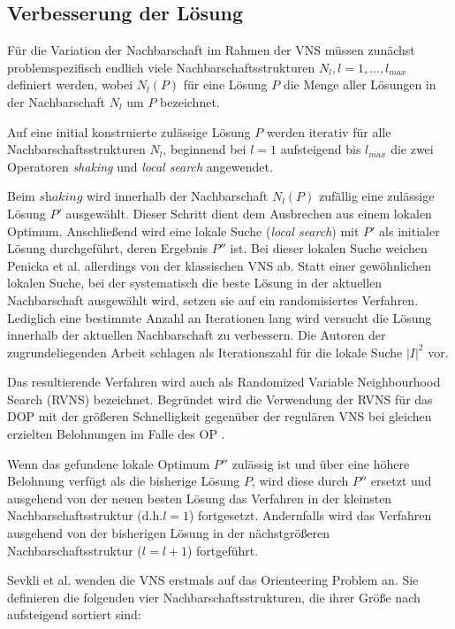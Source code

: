 \documentclass[12pt,a4paper,twoside]{article}
\theoremstyle{definition}
\numberwithin{equation}{section}
\begin{document}
\subsection{Verbesserung der Lösung}\label{subsection:improvement}
Für die Variation der Nachbarschaft im Rahmen der VNS müssen zunächst problemspezifisch endlich viele Nachbarschaftsstrukturen $N_l, l = 1,...,l_{max}$ definiert werden, wobei $N_l(P)$ für eine Lösung $P$ die Menge aller Lösungen in der Nachbarschaft $N_l$ um $P$ bezeichnet.

Auf eine initial konstruierte zulässige Lösung $P$ werden iterativ für alle Nachbarschaftsstrukturen $N_l$, beginnend bei $l = 1$ aufsteigend bis $l_{max}$ die zwei Operatoren \textit{shaking} und \textit{local search} angewendet.

Beim $\textit{shaking}$ wird innerhalb der Nachbarschaft $N_l(P)$ zufällig eine zulässige Lösung $P'$ ausgewählt. Dieser Schritt dient dem Ausbrechen aus einem lokalen Optimum. Anschließend wird eine lokale Suche (\textit{local search}) mit $P'$ als initialer Lösung durchgeführt, deren Ergebnis $P''$ ist.
Bei dieser lokalen Suche weichen Penicka et al. \cite{R.Penicka.2017} allerdings von der klassischen VNS ab. Statt einer gewöhnlichen lokalen Suche, bei der systematisch die beste Lösung in der aktuellen Nachbarschaft ausgewählt wird, setzen sie auf ein randomisiertes Verfahren. Lediglich eine bestimmte Anzahl an Iterationen lang wird versucht die Lösung innerhalb der aktuellen Nachbarschaft zu verbessern. Die Autoren der zugrundeliegenden Arbeit schlagen als Iterationszahl für die lokale Suche $|I|^2$ vor.

Das resultierende Verfahren wird auch als Randomized Variable Neighbourhood Search (RVNS) bezeichnet. Begründet wird die Verwendung der RVNS für das DOP mit der größeren Schnelligkeit gegenüber der regulären VNS bei gleichen erzielten Belohnungen im Falle des OP \cite{Sevkli.2006}.

Wenn das gefundene lokale Optimum $P''$ zulässig ist und über eine höhere Belohnung verfügt als die bisherige Lösung $P$, wird diese durch $P''$ ersetzt und ausgehend von der neuen besten Lösung das Verfahren in der kleinsten Nachbarschaftsstruktur (d.h.$l = 1$) fortgesetzt. Andernfalls wird das Verfahren ausgehend von der bisherigen Lösung in der nächstgrößeren Nachbarschaftsstruktur ($l = l+1$) fortgeführt.

Sevkli et al. \cite{Sevkli.2006} wenden die VNS erstmals auf das Orienteering Problem an. Sie definieren die folgenden vier Nachbarschaftsstrukturen, die ihrer Größe nach aufsteigend sortiert sind:
\end{document}
